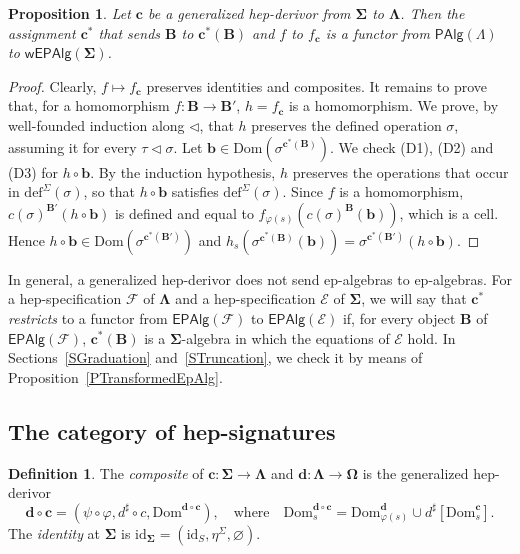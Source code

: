 \documentclass[a4paper,reqno]{amsart}
\newcommand{\sig}[1]{\mathbf{#1}}                %
\newcommand{\spec}[1]{\boldsymbol{\mathcal{#1}}} %
\newcommand{\Dom}{\mathrm{Dom}}
\newcommand{\id}{\mathrm{id}}
\newcommand{\EPAlg}{\mathsf{EPAlg}}
\newcommand{\PAlg}{\mathsf{PAlg}}
\newcommand{\mor}{\to}
\newcommand{\defi}{\mathrm{def}}
\theoremstyle{plain}
\newtheorem{proposition}[theorem]{Proposition}
\theoremstyle{definition}
\newtheorem{definition}[theorem]{Definition}
\begin{document}
\begin{proposition}\label{PGenHepDerivorFunctor}
Let $\mathbf{c}$ be a generalized hep-derivor from $\sig{\Sigma}$ to $\sig{\Lambda}$.
Then the assignment $\mathbf{c}^{\ast}$ that sends $\mathbf{B}$ to $\mathbf{c}^{\ast}(\mathbf{B})$ and $f$ to $f_{\mathbf{c}}$ is a functor from $\PAlg(\Lambda)$ to $\mathsf{wEPAlg}(\sig{\Sigma})$.
\end{proposition}
\begin{proof}
Clearly, $f\mapsto f_{\mathbf{c}}$ preserves identities and composites.
It remains to prove that, for a homomorphism $f\colon\mathbf{B}\mor\mathbf{B}'$, $h=f_{\mathbf{c}}$ is a homomorphism.
We prove, by well-founded induction along $\lhd$, that $h$ preserves the defined operation $\sigma$, assuming it for every $\tau\lhd\sigma$.
Let $\mathbf{b}\in\Dom(\sigma^{\mathbf{c}^{\ast}(\mathbf{B})})$.
We check (D1), (D2) and (D3) for $h\circ\mathbf{b}$.
By the induction hypothesis, $h$ preserves the operations that occur in $\defi^{\Sigma}(\sigma)$, so that $h\circ\mathbf{b}$ satisfies $\defi^{\Sigma}(\sigma)$.
Since $f$ is a homomorphism, $c(\sigma)^{\mathbf{B}'}(h\circ\mathbf{b})$ is defined and equal to $f_{\varphi(s)}(c(\sigma)^{\mathbf{B}}(\mathbf{b}))$, which is a cell.
Hence $h\circ\mathbf{b}\in\Dom(\sigma^{\mathbf{c}^{\ast}(\mathbf{B}')})$ and $h_{s}(\sigma^{\mathbf{c}^{\ast}(\mathbf{B})}(\mathbf{b}))=\sigma^{\mathbf{c}^{\ast}(\mathbf{B}')}(h\circ\mathbf{b})$.
\end{proof}

In general, a generalized hep-derivor does not send ep-algebras to ep-algebras.
For a hep-specification $\spec{F}$ of $\sig{\Lambda}$ and a hep-specification $\spec{E}$ of $\sig{\Sigma}$, we will say that $\mathbf{c}^{\ast}$ \emph{restricts} to a functor from $\EPAlg(\spec{F})$ to $\EPAlg(\spec{E})$ if, for every object $\mathbf{B}$ of $\EPAlg(\spec{F})$, $\mathbf{c}^{\ast}(\mathbf{B})$ is a $\sig{\Sigma}$-algebra in which the equations of $\spec{E}$ hold.
In Sections~\ref{SGraduation} and~\ref{STruncation}, we check it by means of Proposition~\ref{PTransformedEpAlg}.

\subsection{The category of hep-signatures}

\begin{definition}\label{DHepComp}
The \emph{composite} of $\mathbf{c}\colon\sig{\Sigma}\mor\sig{\Lambda}$ and $\mathbf{d}\colon\sig{\Lambda}\mor\sig{\Omega}$ is the generalized hep-derivor
$$
\mathbf{d}\circ\mathbf{c}=\left(\psi\circ\varphi,d^{\sharp}\circ c,\Dom^{\mathbf{d}\circ\mathbf{c}}\right),
\quad\text{where}\quad
\Dom^{\mathbf{d}\circ\mathbf{c}}_{s}=\Dom^{\mathbf{d}}_{\varphi(s)}\cup d^{\sharp}\left[\Dom^{\mathbf{c}}_{s}\right].
$$
The \emph{identity} at $\sig{\Sigma}$ is $\id_{\sig{\Sigma}}=(\id_{S},\eta^{\Sigma},\varnothing)$.
\end{definition}
\end{document}
